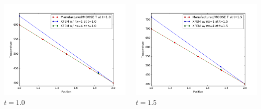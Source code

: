 \documentclass[]{beamer}
\begin{document}
\begin{frame}[t]
\begin{columns}
\begin{center}
			\includegraphics[scale=0.17]{figures/1D_rz_homog1mat_u_vs_x_10}\\
			$t=1.0$
			\end{center}
			\begin{center}
			\includegraphics[scale=0.17]{figures/1D_rz_homog1mat_u_vs_x_15}\\
			$t=1.5$			
			
			\null
			

\end{center}
\end{columns}
\end{frame}
\end{document}

